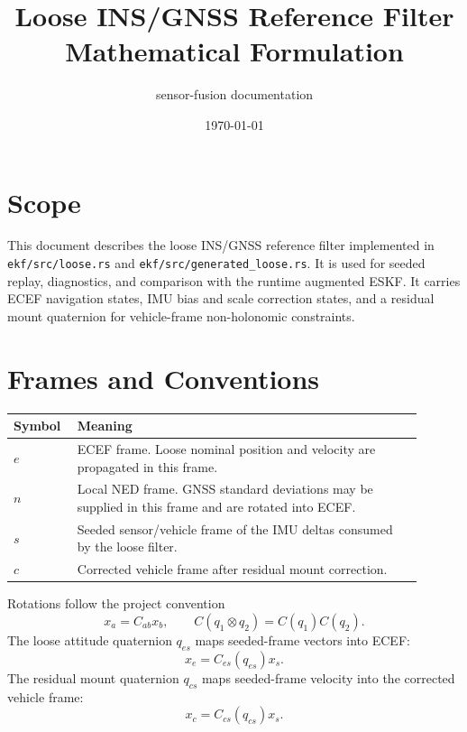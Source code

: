 \documentclass[11pt]{article}
\title{Loose INS/GNSS Reference Filter Mathematical Formulation}
\author{sensor-fusion documentation}
\date{\today}
\begin{document}
\maketitle
\tableofcontents
\newpage

\section{Scope}

This document describes the loose INS/GNSS reference filter implemented in
\texttt{ekf/src/loose.rs} and \texttt{ekf/src/generated\_loose.rs}. It is used
for seeded replay, diagnostics, and comparison with the runtime augmented ESKF.
It carries ECEF navigation states, IMU bias and scale correction states, and a
residual mount quaternion for vehicle-frame non-holonomic constraints.

\section{Frames and Conventions}

\begin{longtable}{>{\raggedright\arraybackslash}p{0.12\linewidth} >{\raggedright\arraybackslash}p{0.78\linewidth}}
\toprule
\textbf{Symbol} & \textbf{Meaning} \\
\midrule
\(e\) & ECEF frame. Loose nominal position and velocity are propagated in this frame. \\
\(n\) & Local NED frame. GNSS standard deviations may be supplied in this frame and are rotated into ECEF. \\
\(s\) & Seeded sensor/vehicle frame of the IMU deltas consumed by the loose filter. \\
\(c\) & Corrected vehicle frame after residual mount correction. \\
\bottomrule
\end{longtable}

Rotations follow the project convention
\begin{equation}
  x_a=C_{ab}x_b,\qquad C(q_1\otimes q_2)=C(q_1)C(q_2).
\end{equation}
The loose attitude quaternion \(q_{es}\) maps seeded-frame vectors into ECEF:
\begin{equation}
  x_e=C_{es}(q_{es})x_s .
\end{equation}
The residual mount quaternion \(q_{cs}\) maps seeded-frame velocity into the
corrected vehicle frame:
\begin{equation}
  x_c=C_{cs}(q_{cs})x_s .
\end{equation}
\end{document}
